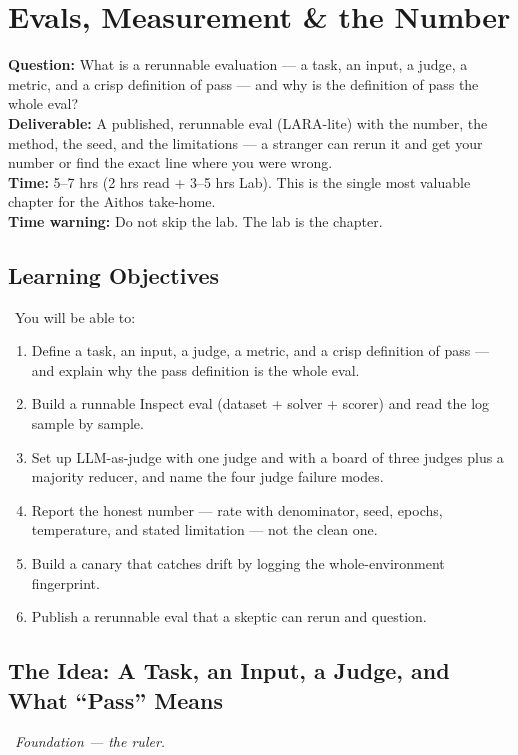 \chapter{Evals, Measurement \& the Number}
\label{ch:5}

\begin{tcolorbox}[colback=lightred,colframe=accent,title=Chapter 5 at a Glance — The Research Core (longest chapter),fonttitle=\bfseries,sharp corners,boxrule=1.5pt]
\textbf{Question:} What is a rerunnable evaluation — a task, an input, a judge, a metric, and a crisp definition of pass — and why is the definition of pass the whole eval?\\[2pt]
\textbf{Deliverable:} A published, rerunnable eval (LARA-lite) with the number, the method, the seed, and the limitations — a stranger can rerun it and get your number or find the exact line where you were wrong.\\[2pt]
\textbf{Time:} 5–7 hrs (2 hrs read + 3–5 hrs Lab). This is the single most valuable chapter for the Aithos take-home.\\[2pt]
\textbf{Time warning:} Do not skip the lab. The lab is the chapter.
\end{tcolorbox}

\section{Learning Objectives}
\fbadge\ You will be able to:
\begin{enumerate}
\item Define a task, an input, a judge, a metric, and a crisp definition of pass — and explain why the pass definition is the whole eval.
\item Build a runnable Inspect eval (dataset + solver + scorer) and read the log sample by sample.
\item Set up LLM-as-judge with one judge and with a board of three judges plus a majority reducer, and name the four judge failure modes.
\item Report the honest number — rate with denominator, seed, epochs, temperature, and stated limitation — not the clean one.
\item Build a canary that catches drift by logging the whole-environment fingerprint.
\item Publish a rerunnable eval that a skeptic can rerun and question.
\end{enumerate}

\section{The Idea: A Task, an Input, a Judge, and What ``Pass'' Means}
\tierF\ \textit{Foundation — the ruler.}

